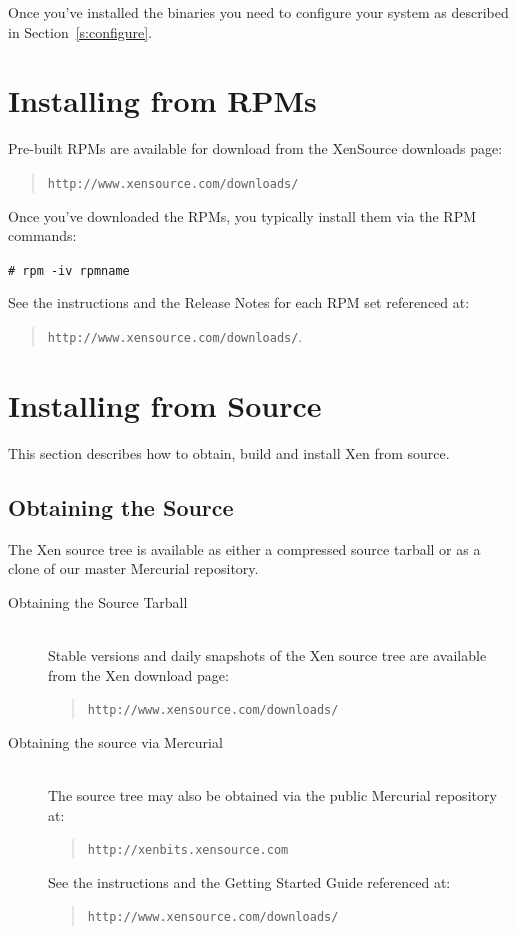 \documentclass[11pt,twoside,final,openright]{report}
\begin{document}
Once you've installed the binaries you need to configure your system as
described in Section~\ref{s:configure}.

\section{Installing from RPMs}
Pre-built RPMs are available for download from the XenSource downloads
page:
\begin{quote} {\tt http://www.xensource.com/downloads/}
\end{quote}

Once you've downloaded the RPMs, you typically install them via the 
RPM commands: 

\verb|# rpm -iv rpmname| 

See the instructions and the Release Notes for each RPM set referenced at:
  \begin{quote}
    {\tt http://www.xensource.com/downloads/}.
  \end{quote}
 
\section{Installing from Source}

This section describes how to obtain, build and install Xen from source.

\subsection{Obtaining the Source}

The Xen source tree is available as either a compressed source tarball
or as a clone of our master Mercurial repository.

\begin{description}
\item[Obtaining the Source Tarball]\mbox{} \\
  Stable versions and daily snapshots of the Xen source tree are
  available from the Xen download page:
  \begin{quote} {\tt \tt http://www.xensource.com/downloads/}
  \end{quote}
\item[Obtaining the source via Mercurial]\mbox{} \\
  The source tree may also be obtained via the public Mercurial
  repository at:
  \begin{quote}{\tt http://xenbits.xensource.com}
  \end{quote} See the instructions and the Getting Started Guide
  referenced at:
  \begin{quote}
    {\tt http://www.xensource.com/downloads/}
  \end{quote}
\end{description}
\end{document}
